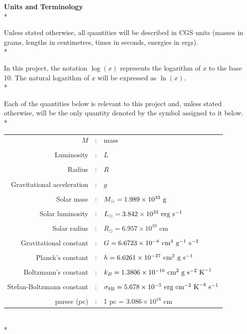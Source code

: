 \documentclass[12pt, a4paper]{report}
\begin{document}
\textbf{Units and Terminology}\\*

Unless stated otherwise, all quantities will be described in CGS units (masses in grams, lengths in centimetres, times in seconds, energies in ergs). \\*

In this project, the notation $\log(x)$ represents the logarithm of $x$ to the base 10. The natural logarithm of $x$ will be expressed as $\ln(x)$. \\*

Each of the quantities below is relevant to this project and, unless stated otherwise, will be the only quantity denoted by the symbol assigned to it below.\\* 

\begin{tabular}{r@{ }c@{ }l}
$M$ &:& mass\\
\\
Luminosity &:& $L$ \\
\\
Radius &:& $R$ \\
\\
Gravitational acceleration &:& $g$ \\
\\
Solar mass &:& $M_{\odot} = 1.989 \times 10^{33} \textnormal{ g}$ \\
\\
Solar luminosity &:& $L_{\odot} = 3.842 \times 10^{33} \textnormal{ erg s}^{-1}$ \\
\\
Solar radius &:& $R_{\odot} = 6.957 \times 10^{10}$ cm \\
\\
Gravitational constant &:& $G = 6.6723 \times 10^{-8} \textnormal{ cm}^{3} \textnormal{ g}^{-1} \textnormal{ s}^{-2}$ \\
\\
Planck's constant &:& $h = 6.6261 \times 10^{-27} \textnormal{ cm}^{2} \textnormal{ g} \textnormal{ s}^{-1}$ \\
\\
Boltzmann's constant &:& $k_{B} = 1.3806 \times 10^{-16} \textnormal{ cm}^{2} \textnormal{ g} \textnormal{ s}^{-2}\textnormal{ K}^{-1}$ \\
\\
Stefan-Boltzmann constant &:& $\sigma_{\textnormal{SB}} = 5.678 \times 10^{-5} \textnormal{ erg cm}^{-2} \textnormal{ K}^{-4} \textnormal{ s}^{-1}$ \\
\\
parsec (pc) &:& 1 pc = $3.086 \times 10^{18}$ cm
\end{tabular}
\\*
\end{document}
